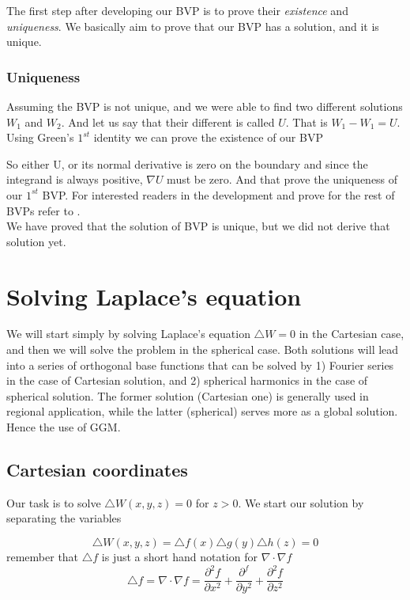 The first step after developing our BVP is to prove their \textit{existence} and \textit{uniqueness}. We basically aim to prove that our BVP has a solution, and it is unique.

\subsubsection{Uniqueness}
Assuming the BVP is not unique, and we were able to find two different solutions $W_1$ and $W_2$. And let us say that their different is called $U$. That is $W_1 - W_1 = U$. Using Green's $1^{st}$ identity we can prove the existence of our BVP


So either U, or its normal derivative is zero on the boundary and since the integrand is always positive, $\nabla U$ must be zero.
And that prove the uniqueness of our $1^{st}$ BVP. For interested readers in the development and prove for the rest of BVPs refer to \cite{lndrem}.  
\\
We have proved that the solution of BVP is unique, but we did not derive that solution yet.

\section{Solving Laplace's equation}
We will start simply by solving Laplace's equation $\triangle W = 0$ in the Cartesian case, and then we will solve the problem in the spherical case. Both solutions will lead into a series of orthogonal base functions that can be solved by 1) Fourier series in the case of Cartesian solution, and 2) spherical harmonics in the case of spherical solution. The former solution (Cartesian one) is generally used in regional application, while the latter (spherical) serves more as a global solution. Hence the use of GGM.

\subsection{Cartesian coordinates}
Our task is to solve $\triangle W(x, y, z) = 0$ for $z > 0$. We start our solution by separating the variables

\begin{equation}
\triangle W(x, y, z) = \triangle f(x) \triangle g(y) \triangle h(z) = 0
\end{equation}
remember that $\triangle f$ is just a short hand notation for $\nabla \cdot \nabla f$
\begin{displaymath}
\triangle f = \nabla \cdot \nabla f = \frac{\partial^2 f}{\partial x^2} + \frac{\partial^f}{\partial y^2} + \frac{\partial^2 f}{\partial z^2}
\end{displaymath}

